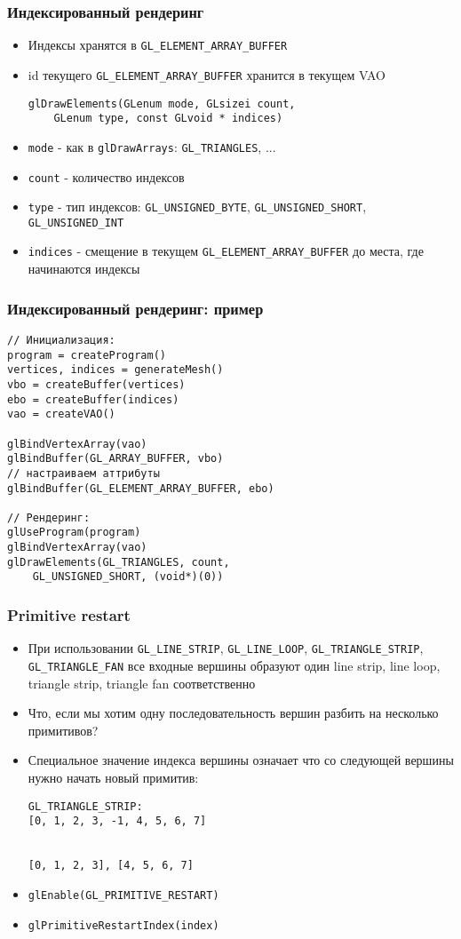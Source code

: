 \documentclass{beamer}
\begin{document}
\begin{frame}[fragile]
\frametitle{Индексированный рендеринг}
\begin{itemize}
\item Индексы хранятся в \verb|GL_ELEMENT_ARRAY_BUFFER|
\item id текущего \verb|GL_ELEMENT_ARRAY_BUFFER| хранится в текущем VAO
\pause
\begin{verbatim}
glDrawElements(GLenum mode, GLsizei count,
    GLenum type, const GLvoid * indices)
\end{verbatim}
\pause
\item \verb|mode| - как в \verb|glDrawArrays|: \verb|GL_TRIANGLES|, ...
\pause
\item \verb|count| - количество индексов
\pause
\item \verb|type| - тип индексов: \verb|GL_UNSIGNED_BYTE|, \verb|GL_UNSIGNED_SHORT|, \verb|GL_UNSIGNED_INT|
\pause
\item \verb|indices| - смещение в текущем \verb|GL_ELEMENT_ARRAY_BUFFER| до места, где начинаются индексы
\end{itemize}
\end{frame}

\begin{frame}[fragile]
\frametitle{Индексированный рендеринг: пример}
\fontsize{10pt}{10pt}
\begin{verbatim}
// Инициализация:
program = createProgram()
vertices, indices = generateMesh()
vbo = createBuffer(vertices)
ebo = createBuffer(indices)
vao = createVAO()

glBindVertexArray(vao)
glBindBuffer(GL_ARRAY_BUFFER, vbo)
// настраиваем аттрибуты
glBindBuffer(GL_ELEMENT_ARRAY_BUFFER, ebo)

// Рендеринг:
glUseProgram(program)
glBindVertexArray(vao)
glDrawElements(GL_TRIANGLES, count,
    GL_UNSIGNED_SHORT, (void*)(0))
\end{verbatim}
\end{frame}

\begin{frame}[fragile]
\frametitle{Primitive restart}
\begin{itemize}
\item При использовании \verb|GL_LINE_STRIP|, \verb|GL_LINE_LOOP|, \verb|GL_TRIANGLE_STRIP|, \verb|GL_TRIANGLE_FAN| все входные вершины образуют один line strip, line loop, triangle strip, triangle fan соответственно
\pause
\item Что, если мы хотим одну последовательность вершин разбить на несколько примитивов?
\pause
\item Специальное значение индекса вершины означает что со следующей вершины нужно начать новый примитив:
\begin{verbatim}
GL_TRIANGLE_STRIP:
[0, 1, 2, 3, -1, 4, 5, 6, 7]


[0, 1, 2, 3], [4, 5, 6, 7]
\end{verbatim}
\pause
\item \verb|glEnable(GL_PRIMITIVE_RESTART)|
\pause
\item \verb|glPrimitiveRestartIndex(index)|
\end{itemize}
\end{frame}
\end{document}
